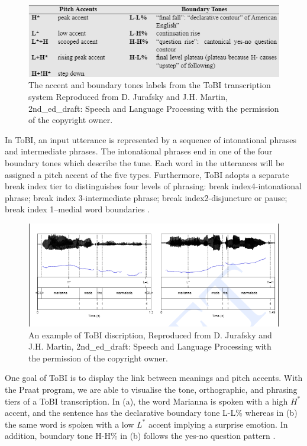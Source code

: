 \begin{figure}[ht]
\includegraphics[width=15cm]{figures/ToBI_1.png}
\caption{The accent and boundary tones labels from the ToBI transcription system Reproduced from D. Jurafsky and J.H. Martin, 2nd\_ed\_draft: Speech and Language Processing with the permission of the copyright owner.}
\label{fig:ToBI1}
\end{figure}

In ToBI, an input utterance is represented by a sequence of intonational phrases and intermediate phrases. The intonational phrases end in one of the four boundary tones which describe the tune. Each word in the utterances will be assigned a pitch accent of the five types. Furthermore, ToBI adopts a separate break index tier to distinguishes four levels of phrasing: break index4-intonational phrase; break index 3-intermediate phrase; break index2-disjuncture or pause; break index 1--medial word boundaries \citep{Hirschberg2002}.


\begin{figure}[ht]
\includegraphics[width=15cm]{figures/ToBI_2.png}
\caption{An example of ToBI discription, Reproduced from D. Jurafsky and J.H. Martin, 2nd\_ed\_draft: Speech and Language Processing with the permission of the copyright owner.}
\label{fig:ToBI2}
\end{figure}

One goal of ToBI is to display the link between meanings and pitch accents. With the Praat program, we are able to visualise the tone, orthographic, and phrasing tiers of a ToBI transcription. In (a), the word Marianna is spoken with a high $H^*$ accent, and the sentence has the declarative boundary tone L-L\% whereas in (b) the same word is spoken with a low $L^*$ accent implying a surprise emotion. In addition, boundary tone H-H\% in (b) follows the yes-no question pattern \citep{Pitrelli1994, Jurafsky2008}. 


